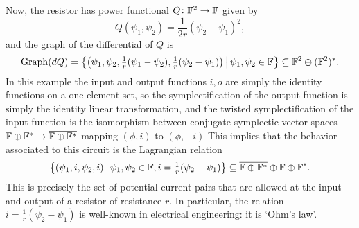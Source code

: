 Now, the resistor has power functional $Q{\colon} {\mathbb F}^2 \to {\mathbb F}$ given by
\[   Q(\psi_1,\psi_2) = \frac1{2r}(\psi_2-\psi_1)^2, \]
and the graph of the differential of $Q$ is
\[
  \mathrm{Graph}(dQ) = \big\{\big(\psi_1,\psi_2,
  \tfrac1r(\psi_1-\psi_2),\tfrac1r(\psi_2-\psi_1)\big) \,\big|\, \psi_1,\psi_2 \in
  {\mathbb F}\big\} \subseteq {\mathbb F}^2 \oplus ({\mathbb F}^2)^\ast.
\]
In this example the input and output functions $i,o$ are simply the identity
functions on a one element set, so the symplectification of the output function
is simply the identity linear transformation, and the twisted symplectification
of the input function is the isomorphism  between conjugate
symplectic vector spaces ${\mathbb F}\oplus{\mathbb F}^\ast \to \overline{{\mathbb F}\oplus{\mathbb F}^\ast}$ mapping $(\phi,i)$ to $(\phi,-i)$ This implies that the behavior associated to this
circuit is the Lagrangian relation
\[
  \big\{(\psi_1,i,\psi_2,i) \,\big|\, \psi_1,\psi_2 \in {\mathbb F}, i =
  \tfrac1r(\psi_2-\psi_1)\big\}\subseteq \overline{{\mathbb F} \oplus {\mathbb F}^\ast} \oplus {\mathbb F}
    \oplus {\mathbb F}^\ast.
\]
This is precisely the set of potential-current pairs that are allowed at the
input and output of a resistor of resistance $r$.  In particular, the relation
$i = \tfrac1r(\psi_2-\psi_1)$ is well-known in electrical engineering: it is
`Ohm's law'.

